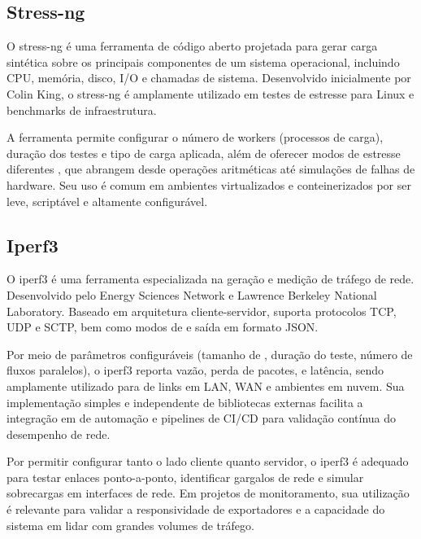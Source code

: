 \subsection{Stress-ng}
\label{subsection:StressNG}

O stress-ng \citep{stressng2025} é uma ferramenta de código aberto projetada para gerar carga sintética sobre os principais componentes de um sistema operacional, incluindo CPU, memória, disco, I/O e chamadas de sistema. Desenvolvido inicialmente por Colin King, o stress-ng é amplamente utilizado em testes de estresse para  Linux e benchmarks de infraestrutura.

A ferramenta permite configurar o número de workers (processos de carga), duração dos testes e tipo de carga aplicada, além de oferecer modos de estresse diferentes , que abrangem desde operações aritméticas até simulações de falhas de hardware. Seu uso é comum em ambientes virtualizados e conteinerizados por ser leve, scriptável e altamente configurável.

\subsection{Iperf3}
\label{subsection:Iperf3}

O iperf3 \citep{iperf32025} é uma ferramenta especializada na geração e medição de tráfego de rede. Desenvolvido pelo Energy Sciences Network e Lawrence Berkeley National Laboratory. Baseado em arquitetura cliente-servidor, suporta protocolos TCP, UDP e SCTP, bem como modos de  e saída em formato JSON.

Por meio de parâmetros configuráveis (tamanho de , duração do teste, número de fluxos paralelos), o iperf3 reporta vazão, perda de pacotes,  e latência, sendo amplamente utilizado para  de links em LAN, WAN e ambientes em nuvem. Sua implementação simples e independente de bibliotecas externas facilita a integração em  de automação e pipelines de CI/CD para validação contínua do desempenho de rede.

Por permitir configurar tanto o lado cliente quanto servidor, o iperf3 é adequado para testar enlaces ponto-a-ponto, identificar gargalos de rede e simular sobrecargas em interfaces de rede. Em projetos de monitoramento, sua utilização é relevante para validar a responsividade de exportadores e a capacidade do sistema em lidar com grandes volumes de tráfego.
    
